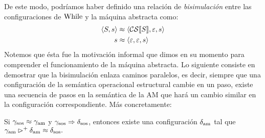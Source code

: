 De este modo, podríamos haber definido una relación de \textit{bisimulación} entre las configuraciones de $\mathrm{While}$ y la máquina abstracta como:
\begin{align*}
    \langle S, s \rangle & \approx \langle \mathcal{CS}[\![S]\!], \varepsilon, s \rangle\\
    s & \approx \langle \varepsilon, \varepsilon, s \rangle
\end{align*}
Notemos que ésta fue la motivación informal que dimos en su momento para comprender el funcionamiento de la máquina abstracta. Lo siguiente consiste en demostrar que la bisimulación enlaza caminos paralelos, es decir, siempre que una configuración de la semántica operacional estructural cambie en un paso, existe una secuencia de pasos en la semántica de la AM que hará un cambio similar en la configuración correspondiente. Más concretamente:
\begin{lema}
Si $\gamma_{\mathrm{sos}} \approx \gamma_{\mathrm{am}}$ y $\gamma_{\mathrm{sos}}\Rightarrow\delta_{\mathrm{sos}}$, entonces existe una configuración $\delta_{\mathrm{am}}$ tal que $\gamma_{\mathrm{am}} \rhd^+ \delta_{\mathrm{am}} \approx \delta_{\mathrm{sos}}.$ 


\end{lema}

